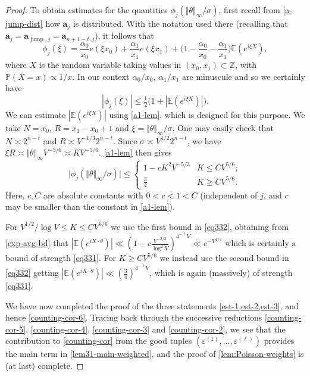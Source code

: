 \documentclass[11pt,reqno]{amsart}
\numberwithin{equation}{section}
\theoremstyle{definition}
\theoremstyle{remark}
\newcommand{\mb}{\mathbb}
\newcommand{\mbf}{\mathbf}
\newcommand{\eps}{\varepsilon}
\renewcommand{\le}{\leqslant}
\renewcommand{\ge}{\geqslant}
\newcommand\Z{\mathbb{Z}}
\newcommand\jump{\operatorname{jump}}
\begin{document}
\begin{proof}
To obtain estimates for the quantities $\phi_j(\Vert \theta \Vert_{\infty}/\sigma)$, first recall from \cref{a-jump-dist} how $\mbf{a}_j$ is distributed. With the notation used there (recalling that $\mbf{a}_j = \mbf{a}_{\jump, j} = \mbf{a}_{n + 1 - t, j}$), it follows that 
\[ \phi_j(\xi) = \frac{\alpha_0}{x_0} e(\xi x_0) + \frac{\alpha_1}{x_1} e(\xi x_1) + \big(1 - \frac{\alpha_0}{x_0} - \frac{\alpha_1}{x_1}\big) \mb{E} (e^{i \xi X}),\] where $X$ is the random variable taking values in $(x_0, x_1) \subset \Z$, with $\mb{P} (X = x) \propto 1/x$. In our context $\alpha_0/x_0$, $\alpha_1/x_1$ are minuscule and so we certainly have
\begin{equation*} |\phi_j(\xi)| \le \tfrac{1}{2}\big(1 + |\mb{E}(e^{i \xi X})|\big).\end{equation*}
We can estimate $|\mb{E}(e^{i \xi X})|$ using \cref{a1-lem}, which is designed for this purpose. We take $N = x_0$, $R = x_1 - x_0 + 1$ and $\xi = \Vert \theta \Vert_{\infty}/\sigma$. One may easily check that $N \asymp 2^{n - t}$ and $R \asymp V^{-1/3} 2^{n - t}$. Since $\sigma \asymp V^{1/2} 2^{n - t}$, we have $\xi R \asymp \Vert \theta \Vert_{\infty} V^{-5/6} \asymp K V^{-5/6}$.
\cref{a1-lem} then gives
\begin{equation} \label{eq332}  \big|\phi_j(\Vert \theta \Vert_{\infty}/\sigma)\big| \le \left\{ \begin{array}{ll} 1 - c K^2 V^{-5/3}  &  K \le CV^{5/6}; \\ \frac{3}{4} & K \ge CV^{5/6}.\end{array} \right.\end{equation}
Here, $c, C$ are absolute constants with $0 < c < 1 < C$ (independent of $j$, and $c$ may be smaller than the constant in \cref{a1-lem}).

For $V^{1/2}/\log V \le K \le CV^{5/6}$ we use the first bound in \cref{eq332}, obtaining from \cref{exp-avg-bd} that $|\mb{E}(e^{i X \cdot \theta})|\ll (1 - c \frac{V^{-2/3}}{\log^2 V})^{4^{-\ell} V} \ll e^{-V^{1/4}}$ which is certainly a bound of strength \cref{eq331}. For $K \ge CV^{5/6}$ we instead use the second bound in \cref{eq332} getting $|\mb{E}(e^{i X \cdot \theta})| \ll (\frac{3}{4})^{4^{-\ell} V}$, which is again (massively) of strength \cref{eq331}.

We have now completed the proof of the three statements \cref{est-1,est-2,est-3}, and hence \cref{counting-cor-6}. Tracing back through the successive reductions \cref{counting-cor-5}, \cref{counting-cor-4}, \cref{counting-cor-3} and \cref{counting-cor-2}, we see that the contribution to \cref{counting-cor} from the good tuples $(\eps^{(1)},\dots, \eps^{(\ell)})$ provides the main term in \cref{lem31-main-weighted}, and the proof of \cref{lem:Poisson-weights} is (at last) complete. \end{proof}
\end{document}

